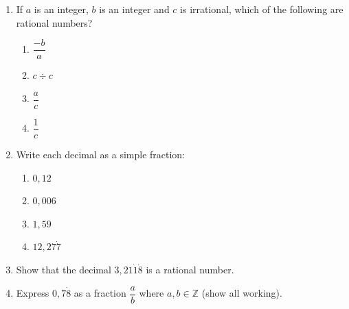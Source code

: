 \begin{eocexercises}{}


\begin{enumerate}[itemsep=5pt, label=\textbf{\arabic*}. ] 
\item If $a$ is an integer, $b$ is an integer and $c$ is irrational, which of the following are rational numbers?
    \begin{enumerate}[itemsep=5pt, label=\textbf{\alph*}. ] 
    \item $\dfrac{-b}{a}$
    \item $c \div c$
    \item $\dfrac{a}{c}$
    \item $\dfrac{1}{c}$
    \end{enumerate}
\item Write each decimal as a simple fraction:
    \begin{enumerate}[itemsep=5pt, label=\textbf{\alph*}. ] 
     \item $0,12$\label{m38348*uid49}
    \item $0,006$\label{m38348*uid50}
    \item $1,59$\label{m38348*uid51}
    \item $12,27\dot{7}$
    \end{enumerate}

\item Show that the decimal $3,21\dot{1}\dot{8}$ is a rational number.
\item Express $0,7\dot{8}$ as a fraction $\dfrac{a}{b}$ where $a,b\in \mathbb{Z}$ (show all working).




\end{enumerate}
\end{eocexercises}
